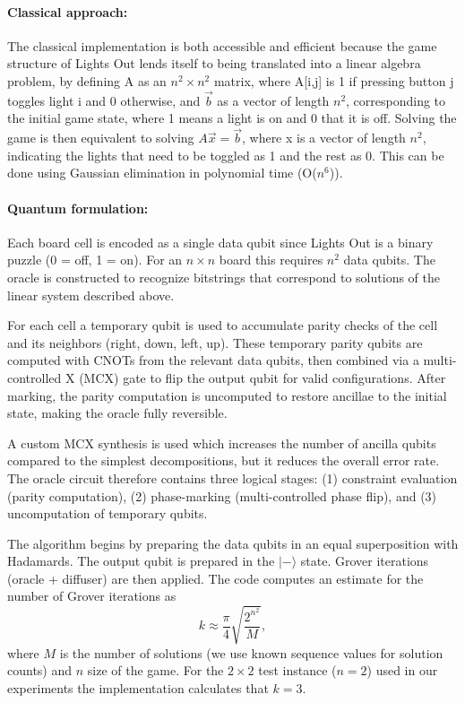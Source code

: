 \paragraph{Classical approach:}
The classical implementation is both accessible and efficient because the game structure of Lights Out lends itself to being translated into a linear algebra problem, by defining A as an $n^2 \times n^2$ matrix, where A[i,j] is 1 if pressing button j toggles light i and 0 otherwise, and $\vec{b}$ as a vector of length $n^2$, corresponding to the initial game state, where 1 means a light is on and 0 that it is off. Solving the game is then equivalent to solving $A\vec{x}=\vec{b}$, where x is a vector of length $n^2$, indicating the lights that need to be toggled as 1 and the rest as 0. This can be done using Gaussian elimination in polynomial time (O($n^6$)).

\paragraph{Quantum formulation:}
Each board cell is encoded as a single data qubit since Lights Out is a binary puzzle (0 = off, 1 = on). For an $n\times n$ board this requires $n^2$ data qubits. The oracle is constructed to recognize bitstrings that correspond to solutions of the linear system described above.

\vspace{1em}
\noindent For each cell a temporary qubit is used to accumulate parity checks of the cell and its neighbors (right, down, left, up). These temporary parity qubits are computed with CNOTs from the relevant data qubits, then combined via a multi-controlled X (MCX) gate to flip the output qubit for valid configurations. After marking, the parity computation is uncomputed to restore ancillae to the initial state, making the oracle fully reversible.

\vspace{1em}
\noindent A custom MCX synthesis\cite{IBMQuantumDocumentationSynthesis, Khattar_2025} is used which increases the number of ancilla qubits compared to the simplest decompositions, but it reduces the overall error rate. The oracle circuit therefore contains three logical stages: (1) constraint evaluation (parity computation), (2) phase-marking (multi-controlled phase flip), and (3) uncomputation of temporary qubits.

\vspace{1em}
\noindent The algorithm begins by preparing the data qubits in an equal superposition with Hadamards. The output qubit is prepared in the $| - \rangle$ state. Grover iterations (oracle + diffuser) are then applied. The code computes an estimate for the number of Grover iterations as
\[
k \approx \frac{\pi}{4}\sqrt{\frac{2^{n^2}}{M}},
\]
where $M$ is the number of solutions (we use known sequence values\cite{oeis_A075462} for solution counts) and $n$ size of the game. For the $2\times 2$ test instance ($n = 2$) used in our experiments the implementation calculates that $k = 3$.

